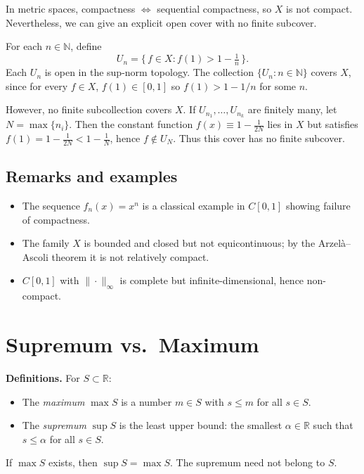 \documentclass[12pt,a4paper]{article}
\theoremstyle{plain}
\theoremstyle{definition}
\theoremstyle{remark}
\theoremstyle{remark}
\begin{document}
In metric spaces, compactness $\Leftrightarrow$ sequential compactness,
so $X$ is not compact. Nevertheless, we can give an explicit open cover with no finite subcover.

For each $n\in\mathbb{N}$, define
\[
U_n = \{\, f\in X : f(1) > 1 - \tfrac{1}{n} \,\}.
\]
Each $U_n$ is open in the sup-norm topology.
The collection $\{U_n : n\in\mathbb{N}\}$ covers $X$, since for every $f\in X$,
$f(1)\in[0,1]$ so $f(1)>1-1/n$ for some $n$.

However, no finite subcollection covers $X$.
If $U_{n_1},\dots,U_{n_k}$ are finitely many, let $N=\max\{n_i\}$.
Then the constant function $f(x)\equiv 1-\tfrac{1}{2N}$ lies in $X$ but satisfies
$f(1)=1-\tfrac{1}{2N}<1-\tfrac{1}{N}$, hence $f\notin U_N$.
Thus this cover has no finite subcover.

\bigskip

\subsection*{Remarks and examples}

\begin{itemize}
	\item The sequence $f_n(x)=x^n$ is a classical example in $C[0,1]$ showing failure of compactness.
	\item The family $X$ is bounded and closed but not equicontinuous; by the Arzelà–Ascoli theorem it is not relatively compact.
	\item $C[0,1]$ with $\|\cdot\|_\infty$ is complete but infinite-dimensional, hence non-compact.
\end{itemize}

\section*{Supremum vs.\ Maximum}

\noindent\textbf{Definitions.}
For $S\subset\mathbb{R}$:
\begin{itemize}
	\item The \emph{maximum} $\max S$ is a number $m\in S$ with $s\le m$ for all $s\in S$.
	\item The \emph{supremum} $\sup S$ is the least upper bound: the smallest $\alpha\in\mathbb{R}$ such that $s\le \alpha$ for all $s\in S$.
\end{itemize}
If $\max S$ exists, then $\sup S=\max S$. The supremum need not belong to $S$.

\smallskip
\end{document}
